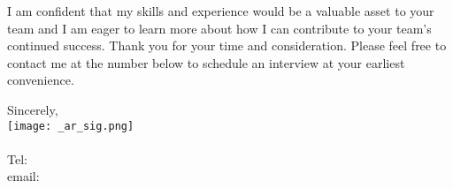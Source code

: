 \documentclass[letterpaper]{article}
\begin{document}
I am confident that my skills and experience would be a valuable asset
to your team and I am eager to learn more about how I can contribute
to your team's continued success.
Thank you for your time and consideration.
Please feel free to contact me at the number below to schedule an interview at your earliest convenience.

Sincerely,\\
    \hspace{1em}
    \texttt{[image: \_ar\_sig.png]} \\
    \CVsigname \\
    \small
    Tel: \CVphone \\
    email: \CVemail
\end{document}
